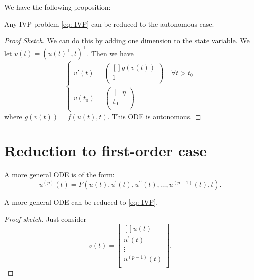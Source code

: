 We have the following proposition:

\begin{proposition}
\label{prop: Reduction to autonomous}
Any IVP problem \eqref{eq: IVP} can be reduced to the autonomous case.
\end{proposition}
\begin{proof}[Proof Sketch]
We can do this by adding one dimension to the state variable. We let $ v(t) = (u(t)^\top , t)^\top  $. Then we have 
\[
    \begin{cases}
        v'(t)  = \begin{pmatrix}[] 
             g(v(t)) \\
             1 \\
        \end{pmatrix}  \quad \forall t>t_0 \\
        v(t_0) = \begin{pmatrix}[] 
             \eta  \\
             t_0 \\
        \end{pmatrix}  
    \end{cases}
\]
where $ g(v(t)) = f(u(t), t) $. This ODE is autonomous. 
\end{proof}

\section{Reduction to first-order case} 
A more general ODE is of the form: 
\[
    u^{(p)}(t) = F(u(t), u^\prime (t), u^{\prime \prime}(t), \ldots ,u^{(p-1)}(t), t).  
\] 


\begin{proposition}
\label{prop: Reudction to first-order case}
A more general ODE can be reduced to \eqref{eq: IVP}. 
\end{proposition}
\begin{proof}[Proof sketch]
Just consider  
\[
    v(t) = \begin{bmatrix}[] 
         u(t) \\
         u^\prime (t) \\
         \vdots \\
         u^{(p-1)}(t) \\
    \end{bmatrix}.  
\]
\end{proof}

